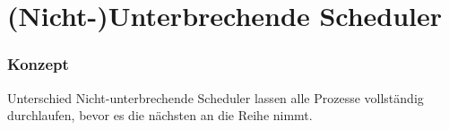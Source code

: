 \section{(Nicht-)Unterbrechende Scheduler}

\begin{frame}
    \frametitle{Konzept}

    \pause

    \begin{block}{Unterschied}
        Nicht-unterbrechende Scheduler lassen alle Prozesse vollständig durchlaufen, bevor es die nächsten an die Reihe nimmt.
    \end{block}
\end{frame}
